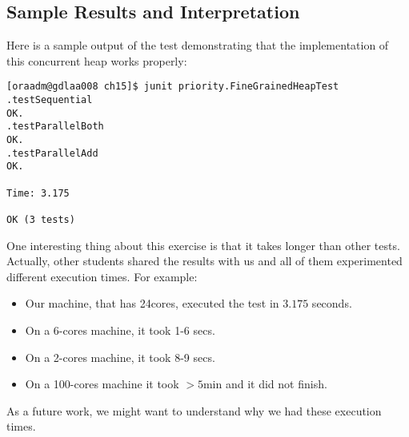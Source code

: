 \subsection{Sample Results and Interpretation}
\par
Here is a sample output of the test demonstrating that the implementation of
this concurrent heap works properly:
\par
\hfill
\begin{verbatim}
[oraadm@gdlaa008 ch15]$ junit priority.FineGrainedHeapTest
.testSequential
OK.
.testParallelBoth
OK.
.testParallelAdd
OK.

Time: 3.175

OK (3 tests)
\end{verbatim}
\hfill
\par
One interesting thing about this exercise is that it takes longer than other
tests. Actually, other students shared the results with us and all of them
experimented different execution times. For example:
\par
\begin{itemize}
\item Our machine, that has 24cores, executed the test in $3.175$ seconds.
\item On a 6-cores machine, it took 1-6 secs.
\item On a 2-cores machine, it took 8-9 secs.
\item On a 100-cores machine it took $> 5$min and it did not finish.
\end{itemize}
\par
As a future work, we might want to understand why we had these execution times.
